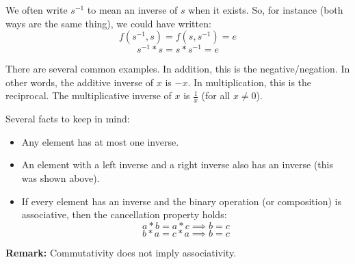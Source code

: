 \documentclass[letterpaper]{article}
\begin{document}
\begin{itemize}
    \bigskip 

    We often write $s^{-1}$ to mean an inverse of $s$ when it exists. So, for instance (both ways are the same thing), we could have written: 
    \[f(s^{-1}, s) = f(s, s^{-1}) = e\]
    \[s^{-1} * s = s * s^{-1} = e\]

    \bigskip 

    There are several common examples. In addition, this is the negative/negation. In other words, the additive inverse of $x$ is $-x$. In multiplication, this is the reciprocal. The multiplicative inverse of $x$ is $\frac{1}{x}$ (for all $x \neq 0$). 
    
    \bigskip 
    
    Several facts to keep in mind: 
    \begin{itemize}
        \item Any element has at most one inverse. 
        \item An element with a left inverse and a right inverse also has an inverse (this was shown above). 
        \item If every element has an inverse and the binary operation (or composition) is associative, then the cancellation property holds: 
        \[a * b = a * c \implies b = c\]
        \[b * a = c * a \implies b = c\]
    \end{itemize}
\end{itemize}

\textbf{Remark:} Commutativity does not imply associativity.

\newpage 
\end{document}
